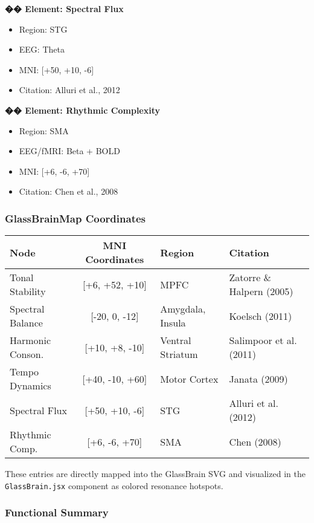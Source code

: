 \textbf{�� Element: Spectral Flux}

\begin{itemize}
    \item Region: STG
    \item EEG: Theta
    \item MNI: [+50, +10, -6]
    \item Citation: Alluri et al., 2012
\end{itemize}

\textbf{�� Element: Rhythmic Complexity}

\begin{itemize}
    \item Region: SMA
    \item EEG/fMRI: Beta + BOLD
    \item MNI: [+6, -6, +70]
    \item Citation: Chen et al., 2008
\end{itemize}

\subsubsection*{GlassBrainMap Coordinates}

\begin{center}
\begin{tabular}{|l|c|l|l|}
\hline
\textbf{Node} & \textbf{MNI Coordinates} & \textbf{Region} & \textbf{Citation} \\
\hline
Tonal Stability & [+6, +52, +10] & MPFC & Zatorre \& Halpern (2005) \\
Spectral Balance & [-20, 0, -12] & Amygdala, Insula & Koelsch (2011) \\
Harmonic Conson. & [+10, +8, -10] & Ventral Striatum & Salimpoor et al. (2011) \\
Tempo Dynamics & [+40, -10, +60] & Motor Cortex & Janata (2009) \\
Spectral Flux & [+50, +10, -6] & STG & Alluri et al. (2012) \\
Rhythmic Comp. & [+6, -6, +70] & SMA & Chen (2008) \\
\hline
\end{tabular}
\end{center}

These entries are directly mapped into the GlassBrain SVG and visualized in the \texttt{GlassBrain.jsx} component as colored resonance hotspots.

\subsubsection*{Functional Summary}

